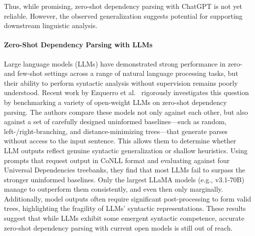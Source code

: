 Thus, while promising, zero-shot dependency parsing with ChatGPT is not yet reliable. However, the observed generalization suggests potential for supporting downstream linguistic analysis.
\paragraph{Zero-Shot Dependency Parsing with LLMs}
Large language models (LLMs) have demonstrated strong performance in zero- and few-shot settings across a range of natural language processing tasks, but their ability to perform syntactic analysis without supervision remains poorly understood. Recent work by Ezquerro et al.\ \cite{ezquerro2025better} rigorously investigates this question by benchmarking a variety of open-weight LLMs on zero-shot dependency parsing. The authors compare these models not only against each other, but also against a set of carefully designed uninformed baselines—such as random, left-/right-branching, and distance-minimizing trees—that generate parses without access to the input sentence. This allows them to determine whether LLM outputs reflect genuine syntactic generalization or shallow heuristics. Using prompts that request output in CoNLL format and evaluating against four Universal Dependencies treebanks, they find that most LLMs fail to surpass the stronger uninformed baselines. Only the largest LLaMA models (e.g., v3.1-70B) manage to outperform them consistently, and even then only marginally. Additionally, model outputs often require significant post-processing to form valid trees, highlighting the fragility of LLMs' syntactic representations. These results suggest that while LLMs exhibit some emergent syntactic competence, accurate zero-shot dependency parsing with current open models is still out of reach.

